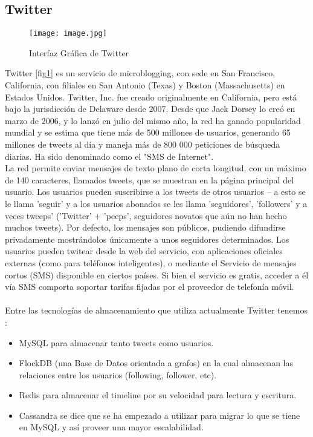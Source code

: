 \documentclass[conference,compsoc]{IEEEtran}
\begin{document}
\subsection{Twitter}

\begin{figure}[!h]
\centering
\texttt{[image: image.jpg]}
\caption{Interfaz Gráfica de Twitter}
\label{twitter}
\end{figure}

Twitter [fig\ref{twitter}] es un servicio de microblogging, con sede en San Francisco, California, con filiales en San Antonio (Texas) y Boston (Massachusetts) en Estados Unidos. Twitter, Inc. fue creado originalmente en California, pero está bajo la jurisdicción de Delaware desde 2007. Desde que Jack Dorsey lo creó en marzo de 2006, y lo lanzó en julio del mismo año, la red ha ganado popularidad mundial y se estima que tiene más de 500 millones de usuarios, generando 65 millones de tweets al día y maneja más de 800 000 peticiones de búsqueda diarias. Ha sido denominado como el "SMS de Internet".\cite{art5}
\\
La red permite enviar mensajes de texto plano de corta longitud, con un máximo de 140 caracteres, llamados tweets, que se muestran en la página principal del usuario. Los usuarios pueden suscribirse a los tweets de otros usuarios  – a esto se le llama 'seguir' y a los usuarios abonados se les llama 'seguidores', 'followers' y a veces tweeps' ('Twitter' + 'peeps', seguidores novatos que aún no han hecho muchos tweets). Por defecto, los mensajes son públicos, pudiendo difundirse privadamente mostrándolos únicamente a unos seguidores determinados. Los usuarios pueden twitear desde la web del servicio, con aplicaciones oficiales externas (como para teléfonos inteligentes), o mediante el Servicio de mensajes cortos (SMS) disponible en ciertos países. Si bien el servicio es gratis, acceder a él vía SMS comporta soportar tarifas fijadas por el proveedor de telefonía móvil.\cite{art5}
\\
\\
Entre las tecnologías de almacenamiento que utiliza actualmente Twitter tenemos \cite{art6}:
\begin{itemize}
\item MySQL para almacenar tanto tweets como usuarios.
\item FlockDB (una Base de Datos orientada a grafos) en la cual almacenan las relaciones entre los usuarios (following, follower, etc).
\item Redis para almacenar el timeline por su velocidad para lectura y escritura.
\item Cassandra se dice que se ha empezado a utilizar para migrar lo que se tiene en MySQL y así proveer una mayor escalabilidad.
\end{itemize}
\end{document}
